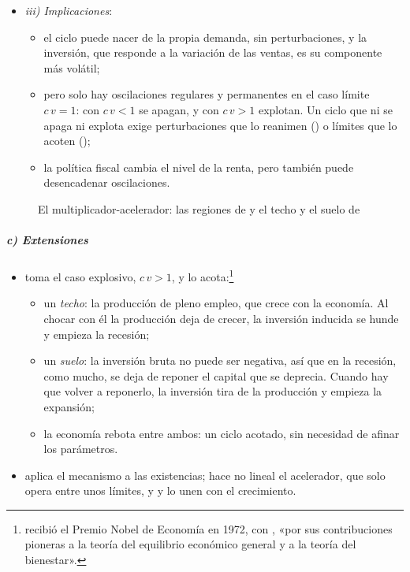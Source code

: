 \documentclass[11pt]{article}
\begin{document}
\begin{itemize}
\begin{itemize}
  \end{itemize}
\item \emph{iii) Implicaciones}:
  \begin{itemize}
  \item el ciclo puede nacer de la propia demanda, sin perturbaciones, y la inversión, que responde a la variación de las ventas, es su componente más volátil;
  \item pero solo hay oscilaciones regulares y permanentes en el caso límite $c\,v=1$: con $c\,v<1$ se apagan, y con $c\,v>1$ explotan. Un ciclo que ni se apaga ni explota exige perturbaciones que lo reanimen () o límites que lo acoten ();
  \item la política fiscal cambia el nivel de la renta, pero también puede desencadenar oscilaciones.
  \end{itemize}
\end{itemize}

\begin{figure}[H]
\centering
\caption{El multiplicador-acelerador: las regiones de  y el techo y el suelo de }\label{fig:multiplicador-acelerador}
\end{figure}

\subparagraph{c) Extensiones}

\begin{itemize}
\item \textcite{Hicks1950Contribution} toma el caso explosivo, $c\,v>1$, y lo acota:\footnote{ recibió el Premio Nobel de Economía en 1972, con , «por sus contribuciones pioneras a la teoría del equilibrio económico general y a la teoría del bienestar»\nocite{Nobel1972HicksArrow}.}
  \begin{itemize}
  \item un \emph{techo}: la producción de pleno empleo, que crece con la economía. Al chocar con él la producción deja de crecer, la inversión inducida se hunde y empieza la recesión;
  \item un \emph{suelo}: la inversión bruta no puede ser negativa, así que en la recesión, como mucho, se deja de reponer el capital que se deprecia. Cuando hay que volver a reponerlo, la inversión tira de la producción y empieza la expansión;
  \item la economía rebota entre ambos: un ciclo acotado, sin necesidad de afinar los parámetros.
  \end{itemize}
\item \textcite{Metzler1941Nature} aplica el mecanismo a las existencias; \textcite{Goodwin1951Nonlinear} hace no lineal el acelerador, que solo opera entre unos límites, y \textcite{Duesenberry1958Business} y \textcite{Pasinetti1960Cyclical} lo unen con el crecimiento.
\end{itemize}
\end{document}

